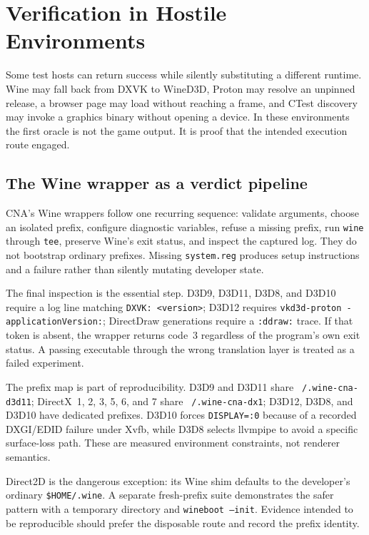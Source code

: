 \chapter{Verification in Hostile Environments}
\label{ch:hostile-environments}

Some test hosts can return success while silently substituting a different runtime.  Wine may
fall back from DXVK to WineD3D, Proton may resolve an unpinned release, a browser page may load
without reaching a frame, and CTest discovery may invoke a graphics binary without opening a
device.  In these environments the first oracle is not the game output.  It is proof that the
intended execution route engaged.

\section{The Wine wrapper as a verdict pipeline}

CNA's Wine wrappers follow one recurring sequence: validate arguments, choose an isolated
prefix, configure diagnostic variables, refuse a missing prefix, run \texttt{wine} through
\texttt{tee}, preserve Wine's exit status, and inspect the captured log.  They do not bootstrap
ordinary prefixes.  Missing \texttt{system.reg} produces setup instructions and a failure rather
than silently mutating developer state.

The final inspection is the essential step.  D3D9, D3D11, D3D8, and D3D10 require a log line
matching \texttt{DXVK: <version>}; D3D12 requires
\texttt{vkd3d-proton - applicationVersion:}; DirectDraw generations require a
\texttt{:ddraw:} trace.  If that token is absent, the wrapper returns code~3 regardless of the
program's own exit status.  A passing executable through the wrong translation layer is treated
as a failed experiment.

The prefix map is part of reproducibility.  D3D9 and D3D11 share
\texttt{\string~/.wine-cna-d3d11}; DirectX~1, 2, 3, 5, 6, and 7 share
\texttt{\string~/.wine-cna-dx1}; D3D12, D3D8, and D3D10 have dedicated prefixes.  D3D10 forces
\texttt{DISPLAY=:0} because of a recorded DXGI/EDID failure under Xvfb, while D3D8 selects
llvmpipe to avoid a specific surface-loss path.  These are measured environment constraints,
not renderer semantics.

Direct2D is the dangerous exception: its Wine shim defaults to the developer's ordinary
\texttt{\$HOME/.wine}.  A separate fresh-prefix suite demonstrates the safer pattern with a
temporary directory and \texttt{wineboot --init}.  Evidence intended to be reproducible should
prefer the disposable route and record the prefix identity.

